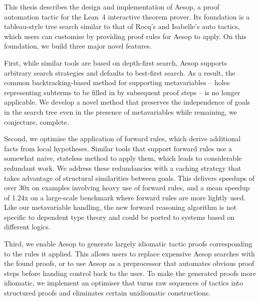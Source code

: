 This thesis describes the design and implementation of Aesop, a proof automation tactic for the Lean~4 interactive theorem prover.
Its foundation is a tableau-style tree search similar to that of Rocq's and Isabelle's auto tactics, which users can customise by providing proof rules for Aesop to apply.
On this foundation, we build three major novel features.

First, while similar tools are based on depth-first search, Aesop supports arbitrary search strategies and defaults to best-first search.
As a result, the common backtracking-based method for supporting metavariables -- holes representing subterms to be filled in by subsequent proof steps -- is no longer applicable.
We develop a novel method that preserves the independence of goals in the search tree even in the presence of metavariables while remaining, we conjecture, complete.

Second, we optimise the application of forward rules, which derive additional facts from local hypotheses.
Similar tools that support forward rules use a somewhat naive, stateless method to apply them, which leads to considerable redundant work.
We address these redundancies with a caching strategy that takes advantage of structural similarities between goals.
This delivers speedups of over 30x on examples involving heavy use of forward rules, and a mean speedup of 1.24x on a large-scale benchmark where forward rules are more lightly used.
Like our metavariable handling, the new forward reasoning algorithm is not specific to dependent type theory and could be ported to systems based on different logics.

Third, we enable Aesop to generate largely idiomatic tactic proofs corresponding to the rules it applied.
This allows users to replace expensive Aesop searches with the found proofs, or to use Aesop as a preprocessor that automates obvious proof steps before handing control back to the user.
To make the generated proofs more idiomatic, we implement an optimiser that turns raw sequences of tactics into structured proofs and eliminates certain unidiomatic constructions.
